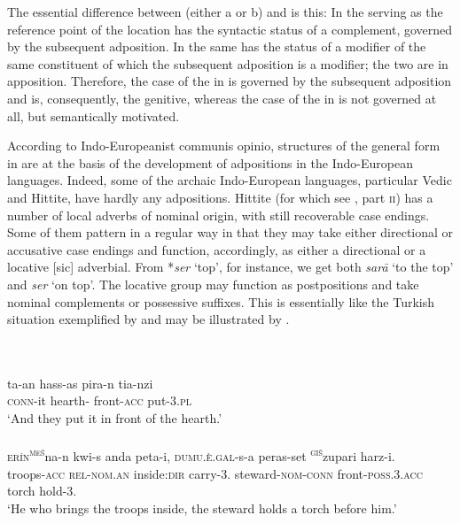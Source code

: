 The essential difference between  (either a or b) and  is this: In  the \np serving as the reference point of the location has the syntactic status of a complement, governed by the subsequent adposition. In  the same \np has the status of a modifier of the same constituent of which the subsequent adposition is a modifier; the two are in apposition. Therefore, the case of the \np in  is governed by the subsequent adposition and is, consequently, the genitive, whereas the case of the \np in  is not governed at all, but semantically motivated.

\label{page98}According to Indo-Europeanist communis opinio, structures of the general form in  are at the basis of the development of adpositions in the Indo-European languages. Indeed, some of the archaic Indo-European languages, particular Vedic and Hittite, have hardly any adpositions. Hittite (for which see \citealt{Starke1977}, part \textsc{ii}) has a number of local adverbs of nominal origin, with still recoverable case endings. Some of them pattern in a regular way in that they may take either directional or accusative case endings and function, accordingly, as either a directional or a locative [sic] adverbial. From *\textit{ser} ‘top’, for instance, we get both \textit{sar\=a} ‘to the top’ and \textit{ser} ‘on top’. The locative group may function as postpositions and take nominal complements or possessive suffixes. This is essentially like the Turkish situation exemplified by  and may be illustrated by .

\ea\label{ex:E68}
\langinfo{\LangHitt}{}{} \\
 \ea {} \\
 \gll  ta-an  hass-as  pira-n  tia-nzi\\
  \textsc{conn}-it  {hearth-\glgen}  front-\textsc{acc}  put-3.\textsc{pl}\\
\glt ‘And they put it in front of the hearth.’ \\

\ex {}\\
\gll  \textsc{er\'{i}n}\textsuperscript{\textsc{me\v{s}}}na-n  kwi-s  anda  peta-i, \textsc{dumu}.\textsc{è}.\textsc{gal}-s-a  peras-set  \textsuperscript{\textsc{gi\v{s}}}zupari  harz-i.\\
troops-\textsc{acc}  \textsc{rel}-\textsc{nom}.\textsc{an}  inside:\textsc{dir}  {carry-3.\glsg} steward-\textsc{nom}-\textsc{conn}  front-\textsc{poss}.3.\textsc{acc}\footnotemark{}  torch  hold-3.\glsg\\
\glt ‘He who brings the troops inside, the steward holds a torch before him.'\\
 \z
 \z
 

